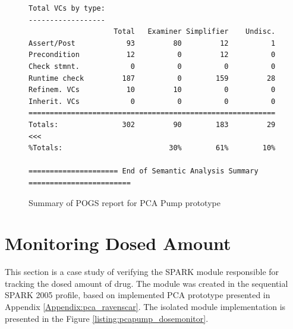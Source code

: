 \begin{figure}
\begin{lstlisting}[frame=single, gobble=0]
Total VCs by type:
------------------
                    Total   Examiner Simplifier    Undisc.
Assert/Post            93         80         12          1
Precondition           12          0         12          0
Check stmnt.            0          0          0          0
Runtime check         187          0        159         28
Refinem. VCs           10         10          0          0
Inherit. VCs            0          0          0          0
==========================================================
Totals:               302         90        183         29 <<<
%Totals:                         30%        61%        10%

===================== End of Semantic Analysis Summary ========================
\end{lstlisting}
\doublespacing
\caption{Summary of POGS report for PCA Pump prototype}
\label{listing:pca_ravenscar:pogs}
\end{figure}



\section{Monitoring Dosed Amount}
\label{verification:pcapump:monitoring}

This section is a case study of verifying the SPARK module responsible for tracking the dosed amount of drug. The module was created in the sequential SPARK 2005 profile, based on implemented PCA prototype presented in Appendix \ref{Appendix:pca_ravenscar}. The isolated module implementation is presented in the Figure \ref{listing:pcapump_dosemonitor}.

